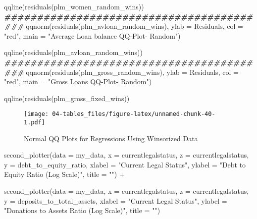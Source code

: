 \documentclass[a4paper,nobind]{templates/ociamthesis}
\newenvironment{Shaded}{\begin{snugshade}}{\end{snugshade}}
\newcommand{\AttributeTok}[1]{\textcolor[rgb]{0.77,0.63,0.00}{#1}}
\newcommand{\DocumentationTok}[1]{\textcolor[rgb]{0.56,0.35,0.01}{\textbf{\textit{#1}}}}
\newcommand{\FunctionTok}[1]{\textcolor[rgb]{0.00,0.00,0.00}{#1}}
\newcommand{\NormalTok}[1]{#1}
\newcommand{\SpecialCharTok}[1]{\textcolor[rgb]{0.00,0.00,0.00}{#1}}
\newcommand{\StringTok}[1]{\textcolor[rgb]{0.31,0.60,0.02}{#1}}
\renewenvironment{Shaded}
{
  \vspace{10pt}%
  \begin{snugshade}%
}{%
  \end{snugshade}%
  \vspace{8pt}%
}
\begin{document}
\begin{landscape}
\begin{Shaded}
\begin{Highlighting}[]
\FunctionTok{qqline}\NormalTok{(}\FunctionTok{residuals}\NormalTok{(plm\_women\_random\_wins))}
\DocumentationTok{\#\#\#\#\#\#\#\#\#\#\#\#\#\#\#\#\#\#\#\#\#\#\#\#\#\#\#\#\#\#\#\#\#\#\#\#\#\#\#\#\#}
\FunctionTok{qqnorm}\NormalTok{(}\FunctionTok{residuals}\NormalTok{(plm\_avloan\_random\_wins), }\AttributeTok{ylab =} \StringTok{\textquotesingle{}Residuals\textquotesingle{}}\NormalTok{, }\AttributeTok{col =} \StringTok{"red"}\NormalTok{, }
       \AttributeTok{main =} \StringTok{"Average Loan balance QQ{-}Plot{-} Random"}\NormalTok{)}

\FunctionTok{qqline}\NormalTok{(}\FunctionTok{residuals}\NormalTok{(plm\_avloan\_random\_wins))}
\DocumentationTok{\#\#\#\#\#\#\#\#\#\#\#\#\#\#\#\#\#\#\#\#\#\#\#\#\#\#\#\#\#\#\#\#\#\#\#\#\#\#\#\#\#}
\FunctionTok{qqnorm}\NormalTok{(}\FunctionTok{residuals}\NormalTok{(plm\_gross\_random\_wins), }\AttributeTok{ylab =} \StringTok{\textquotesingle{}Residuals\textquotesingle{}}\NormalTok{, }\AttributeTok{col =} \StringTok{"red"}\NormalTok{, }
       \AttributeTok{main =} \StringTok{"Gross Loans QQ{-}Plot{-} Random"}\NormalTok{)}

\FunctionTok{qqline}\NormalTok{(}\FunctionTok{residuals}\NormalTok{(plm\_gross\_fixed\_wins))}
\end{Highlighting}
\end{Shaded}

\begin{figure}
\centering
\texttt{[image: 04-tables\_files/figure-latex/unnamed-chunk-40-1.pdf]}
\caption{\label{fig:unnamed-chunk-40}Normal QQ Plots for Regressions Using Winsorized Data}
\end{figure}

\newpage

\begin{Shaded}
\begin{Highlighting}[]
\FunctionTok{second\_plotter}\NormalTok{(}\AttributeTok{data =}\NormalTok{ my\_data, }\AttributeTok{x =}\NormalTok{ currentlegalstatus, }
        \AttributeTok{z =}\NormalTok{ currentlegalstatus,}
        \AttributeTok{y =}\NormalTok{ debt\_to\_equity\_ratio, }
        \AttributeTok{xlabel =} \StringTok{"Current Legal Status"}\NormalTok{, }
        \AttributeTok{ylabel =} \StringTok{"Debt to Equity Ratio (Log Scale)"}\NormalTok{, }
        \AttributeTok{title =} \StringTok{""}\NormalTok{) }\SpecialCharTok{+}
  
\FunctionTok{second\_plotter}\NormalTok{(}\AttributeTok{data =}\NormalTok{ my\_data, }\AttributeTok{x =}\NormalTok{ currentlegalstatus, }
        \AttributeTok{z =}\NormalTok{ currentlegalstatus,}
        \AttributeTok{y =}\NormalTok{ deposits\_to\_total\_assets, }
        \AttributeTok{xlabel =} \StringTok{"Current Legal Status"}\NormalTok{, }
        \AttributeTok{ylabel =} \StringTok{"Donations to Assets Ratio (Log Scale)"}\NormalTok{, }
        \AttributeTok{title =} \StringTok{""}\NormalTok{)}
\end{Highlighting}
\end{Shaded}


\end{landscape}
\end{document}
